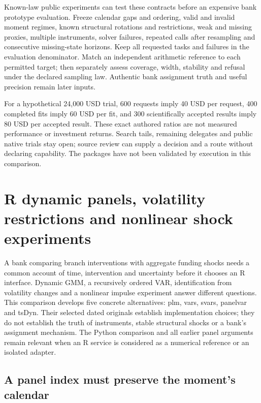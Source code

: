 Known-law public experiments can test these contracts before an expensive bank prototype evaluation. Freeze calendar gaps and ordering, valid and invalid moment regimes, known structural rotations and restrictions, weak and missing proxies, multiple instruments, solver failures, repeated calls after resampling and consecutive missing-state horizons. Keep all requested tasks and failures in the evaluation denominator. Match an independent arithmetic reference to each permitted target; then separately assess coverage, width, stability and refusal under the declared sampling law. Authentic bank assignment truth and useful precision remain later inputs.

For a hypothetical 24,000 USD trial, 600 requests imply 40 USD per request, 400 completed fits imply 60 USD per fit, and 300 scientifically accepted results imply 80 USD per accepted result. These exact authored ratios are not measured performance or investment returns. Search tails, remaining delegates and public native trials stay open; source review can supply a decision and a route without declaring capability. The packages have not been validated by execution in this comparison.~\citep{exec25_pydyn_choice}


\section[R dynamic panels and structural shocks]{R dynamic panels, volatility restrictions and nonlinear shock experiments}
\label{sec:exec25-r-dynamic}

A bank comparing branch interventions with aggregate funding shocks needs a common account of time, intervention and uncertainty before it chooses an R interface. Dynamic GMM, a recursively ordered VAR, identification from volatility changes and a nonlinear impulse experiment answer different questions. This comparison develops five concrete alternatives: plm, vars, svars, panelvar and tsDyn. Their selected dated originals establish implementation choices; they do not establish the truth of instruments, stable structural shocks or a bank's assignment mechanism. The Python comparison and all earlier panel arguments remain relevant when an R service is considered as a numerical reference or an isolated adapter.~\citep{exec25_rdyn_plm,exec25_rdyn_vars,exec25_rdyn_svars,exec25_rdyn_panelvar,exec25_rdyn_tsdyn,exec25_rdyn_choice}

\subsection{A panel index must preserve the moment's calendar}

